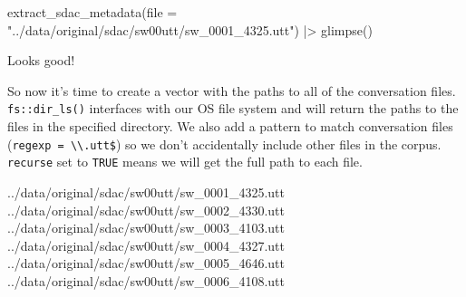 \documentclass[
  letterpaper,
  DIV=11,
  numbers=noendperiod]{scrreport}
\newenvironment{Shaded}{\begin{snugshade}}{\end{snugshade}}
\newcommand{\AttributeTok}[1]{\textcolor[rgb]{0.00,0.00,0.00}{#1}}
\newcommand{\CommentTok}[1]{\textcolor[rgb]{0.00,0.00,0.00}{\textit{#1}}}
\newcommand{\ConstantTok}[1]{\textcolor[rgb]{0.00,0.00,0.00}{#1}}
\newcommand{\FunctionTok}[1]{\textcolor[rgb]{0.00,0.00,0.00}{#1}}
\newcommand{\NormalTok}[1]{\textcolor[rgb]{0.00,0.00,0.00}{#1}}
\newcommand{\OtherTok}[1]{\textcolor[rgb]{0.00,0.00,0.00}{#1}}
\newcommand{\SpecialCharTok}[1]{\textcolor[rgb]{0.00,0.00,0.00}{#1}}
\newcommand{\StringTok}[1]{\textcolor[rgb]{0.00,0.00,0.00}{#1}}
\theoremstyle{definition}
\theoremstyle{remark}
\begin{document}
\begin{Shaded}
\begin{Highlighting}[]
\FunctionTok{extract\_sdac\_metadata}\NormalTok{(}\AttributeTok{file =} \StringTok{"../data/original/sdac/sw00utt/sw\_0001\_4325.utt"}\NormalTok{) }\SpecialCharTok{|\textgreater{}}
  \FunctionTok{glimpse}\NormalTok{()}
\end{Highlighting}
\end{Shaded}

Looks good!

So now it's time to create a vector with the paths to all of the
conversation files. \texttt{fs::dir\_ls()} interfaces with our OS file
system and will return the paths to the files in the specified
directory. We also add a pattern to match conversation files
(\texttt{regexp\ =\ \textbackslash{}\textbackslash{}.utt\$}) so we don't
accidentally include other files in the corpus. \texttt{recurse} set to
\texttt{TRUE} means we will get the full path to each file.

\begin{Shaded}
\end{Shaded}

\begin{Shaded}
\begin{Highlighting}[]
\NormalTok{../data/original/sdac/sw00utt/sw\_0001\_4325.utt}
\NormalTok{../data/original/sdac/sw00utt/sw\_0002\_4330.utt}
\NormalTok{../data/original/sdac/sw00utt/sw\_0003\_4103.utt}
\NormalTok{../data/original/sdac/sw00utt/sw\_0004\_4327.utt}
\NormalTok{../data/original/sdac/sw00utt/sw\_0005\_4646.utt}
\NormalTok{../data/original/sdac/sw00utt/sw\_0006\_4108.utt}
\end{Highlighting}
\end{Shaded}
\end{document}
